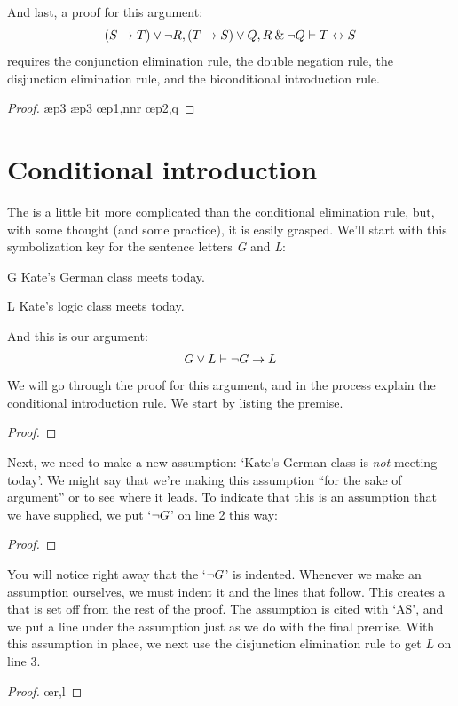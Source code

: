 \begin{earg}
\item[\ex{14.6.7}] And last, a proof for this argument: $$(S \rightarrow T) \vee {\neg} R, (T \rightarrow S) \vee Q, R \mathbin{\&} {\neg} Q \vdash T \leftrightarrow S$$ requires the conjunction elimination rule, the double negation rule, the disjunction elimination rule, and the biconditional introduction rule.
\begin{proof}
	 \pr{}
	 \pr{}
	 \pr{}
	 \ae{p3}
	 \ae{p3}
	 
	 \oe{p1,nnr}
	 \oe{p2,q}
	 
\end{proof}\medskip
\end{earg}


\section{Conditional introduction}\label{s:CI-rule}

The  is a little bit more complicated than the conditional elimination rule, but, with some thought (and some practice), it is easily grasped. We'll start with this symbolization key for the sentence letters \textit{G} and \textit{L}:
	\begin{ekey}
		\item[G] Kate's German class meets today.
		\item[L] Kate's logic class meets today.
	\end{ekey}
And this is our argument: 
$$G \vee L \vdash {\neg} G \rightarrow L$$
We will go through the proof for this argument, and in the process explain the conditional introduction rule. We start by listing the premise.
	\begin{proof}
		 \pr{}
	\end{proof}
Next, we need to make a new assumption: `Kate's German class is \textit{not} meeting today'. We might say that we're making this assumption ``for the sake of argument'' or to see where it leads. To indicate that this is an assumption that we have supplied, we put `${\neg} G$' on line 2 this way:
	\begin{proof}
		 \pr{}
		\open
			 \as{}
	\end{proof}
You will notice right away that the `${\neg} G$' is indented. Whenever we make an assumption ourselves, we must indent it and the lines that follow. This creates a  that is set off from the rest of the proof. The assumption is cited with `AS', and we put a line under the assumption just as we do with the final premise.
With this assumption in place, we next use the disjunction elimination rule to get $L$ on line 3.
	\begin{proof}
		 \pr{}
		\open
			 \as{}
			\oe{r,l}
	\end{proof}

